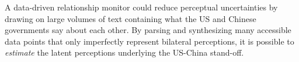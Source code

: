 \documentclass[12pt,letterpaper]{article}
\begin{document}
A data-driven relationship monitor could reduce perceptual uncertainties by drawing on large volumes of text containing what the US and Chinese governments say about each other. By parsing and synthesizing many accessible data points that only imperfectly represent bilateral perceptions, it is possible to \emph{estimate} the latent perceptions underlying the US-China stand-off.

\begin{singlespace}
\setlength{\bibitemsep}{0.6\baselineskip}
\printbibliography[title={References}]
\end{singlespace}
\end{document}
